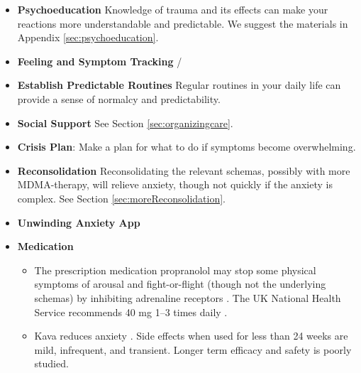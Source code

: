 \documentclass[12pt,letterpaper]{book}
\begin{document}
\begin{itemize}
\begin{itemize}
    \end{itemize}
    \item \textbf{Psychoeducation} Knowledge of trauma and its effects can make your reactions more understandable and predictable. We suggest the materials in Appendix \ref{sec:psychoeducation}.
    \item \textbf{Feeling and Symptom Tracking} /
    \item \textbf{Establish Predictable Routines} Regular routines in your daily life can provide a sense of normalcy and predictability. 
    \item \textbf{Social Support} See Section \ref{sec:organizingcare}.
    \item \textbf{Crisis Plan}: Make a plan for what to do if symptoms become overwhelming. 
    \item \textbf{Reconsolidation} Reconsolidating the relevant schemas, possibly with more MDMA-therapy, will relieve anxiety, though not quickly if the anxiety is complex. See Section \ref{sec:moreReconsolidation}.
    \item \textbf{Unwinding Anxiety App} \todo{}
    \item \textbf{Medication}
    \begin{itemize}
        \item The prescription medication propranolol may stop some physical symptoms of arousal and fight-or-flight (though not the underlying schemas) by inhibiting adrenaline receptors \cite{steenenPropranalol}. The UK National Health Service recommends 40 mg 1–3 times daily \cite{nhsPropranalol}.
        \item Kava reduces anxiety \cite{Pittler03kava}. Side effects when used for less than 24 weeks are mild, infrequent, and transient. Longer term efficacy and safety is poorly studied.
    \end{itemize}
\end{itemize}
\end{document}
